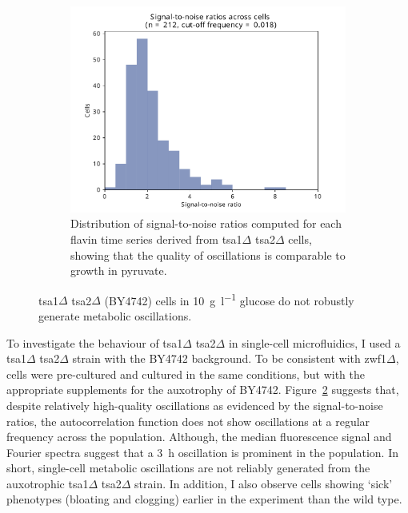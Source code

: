 \begin{figure}
  \begin{subfigure}[t]{0.45\textwidth}
   \centering
   \includegraphics[width=\textwidth]{tsa1tsa2morgan_1649_10.pdf}
   \caption{
    Distribution of signal-to-noise ratios computed for each flavin time series derived from tsa1$\Delta$ tsa2$\Delta$ cells, showing that the quality of oscillations is comparable to growth in pyruvate.
   }
   \label{fig:biology-tsa1tsa2-snr}
  \end{subfigure}%

  \caption{
    tsa1$\Delta$ tsa2$\Delta$ (BY4742) cells in \SI{10}{\gram~\litre^{-1}} glucose do not robustly generate metabolic oscillations.
  }
  \label{fig:biology-tsa1tsa2}
\end{figure}


To investigate the behaviour of tsa1$\Delta$ tsa2$\Delta$ in single-cell microfluidics, I used a tsa1$\Delta$ tsa2$\Delta$ strain with the BY4742 background.
To be consistent with zwf1$\Delta$, cells were pre-cultured and cultured in the same conditions, but with the appropriate supplements for the auxotrophy of BY4742.
Figure~\ref{fig:biology-tsa1tsa2} suggests that, despite relatively high-quality oscillations as evidenced by the signal-to-noise ratios, the autocorrelation function does not show oscillations at a regular frequency across the population.
Although, the median fluorescence signal and Fourier spectra suggest that a \SI{3}{\hour} oscillation is prominent in the population.
In short, single-cell metabolic oscillations are not reliably generated from the auxotrophic tsa1$\Delta$ tsa2$\Delta$ strain.
In addition, I also observe cells showing `sick' phenotypes (bloating and clogging) earlier in the experiment than the wild type.

